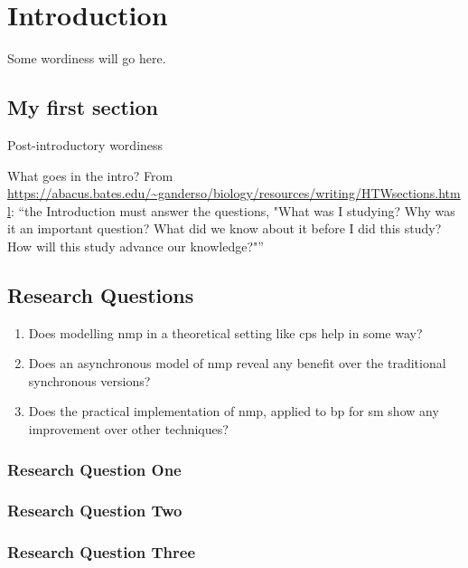 \chapter{Introduction}
Some wordiness will go here.

\section{My first section}
Post-introductory wordiness


\begin{anfxwarning}{What goes in the intro?}
From \url{https://abacus.bates.edu/~ganderso/biology/resources/writing/HTWsections.html}:  ``the Introduction must answer the questions, "What was I studying? Why was it an important question? What did we know about it before I did this study? How will this study advance our knowledge?"''
\end{anfxwarning}

\section{Research Questions}
\begin{enumerate}
    \item Does modelling \gls{nmp} in a theoretical setting like \gls{cps} help in some way?
    \item Does an asynchronous model of \gls{nmp} reveal any benefit over the traditional synchronous versions?
    \item Does the practical implementation of \gls{nmp}, applied to \gls{bp} for \gls{sm} show any improvement over other techniques?
\end{enumerate}

\subsection{Research Question One}

\subsection{Research Question Two}

\subsection{Research Question Three}

